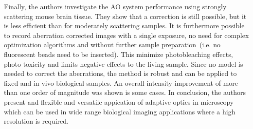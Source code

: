 Finally, the authors investigate the AO system performance using strongly scattering mouse brain tissue. They show that a correction is still possible, but it is less efficient than for moderately scattering samples. It is furthermore possible to record aberration corrected images with a single exposure, no need for complex optimization algorithms and without further sample preparation~(i.e. no fluorescent beads need to be inserted). This minimize photobleaching effects, photo-toxicity and limits negative effects to the living sample. Since no model is needed to correct the aberrations, the method is robust and can be applied to fixed and in vivo biological samples. An overall intensity improvement of more than one order of magnitude was shown is some cases. 
In conclusion, the authors present and flexible and versatile appication of adaptive optics in microscopy which can be used in wide range biological imaging applications where a high resolution is required. 

